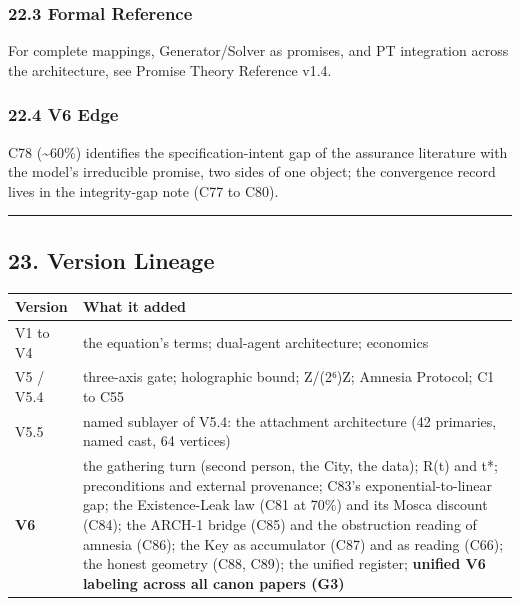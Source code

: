 \documentclass[
  11pt,
]{article}
\newcounter{none} %
\begin{document}
\subsubsection{22.3 Formal Reference}\label{formal-reference}

For complete mappings, Generator/Solver as promises, and PT integration
across the architecture, see Promise Theory Reference v1.4.

\subsubsection{22.4 V6 Edge}\label{v6-edge}

C78 (\textasciitilde60\%) identifies the specification-intent gap of the
assurance literature with the model's irreducible promise, two sides of
one object; the convergence record lives in the integrity-gap note (C77
to C80).

\begin{center}\rule{0.5\linewidth}{0.5pt}\end{center}

\subsection{23. Version Lineage}\label{version-lineage}

{\def\LTcaptype{none} %
\begin{longtable}[]{@{}
  >{\raggedright\arraybackslash}p{}
  >{\raggedright\arraybackslash}p{}@{}}
\toprule\noalign{}
\begin{minipage}[b]{\linewidth}\raggedright
Version
\end{minipage} & \begin{minipage}[b]{\linewidth}\raggedright
What it added
\end{minipage} \\
\midrule\noalign{}
\endhead
\bottomrule\noalign{}
\endlastfoot
V1 to V4 & the equation's terms; dual-agent architecture; economics \\
V5 / V5.4 & three-axis gate; holographic bound; Z/(2⁶)Z; Amnesia
Protocol; C1 to C55 \\
V5.5 & named sublayer of V5.4: the attachment architecture (42
primaries, named cast, 64 vertices) \\
\textbf{V6} & the gathering turn (second person, the City, the data);
R(t) and t*; preconditions and external provenance; C83's
exponential-to-linear gap; the Existence-Leak law (C81 at 70\%) and its
Mosca discount (C84); the ARCH-1 bridge (C85) and the obstruction
reading of amnesia (C86); the Key as accumulator (C87) and as reading
(C66); the honest geometry (C88, C89); the unified register;
\textbf{unified V6 labeling across all canon papers (G3)} \\
\end{longtable}
}
\end{document}
